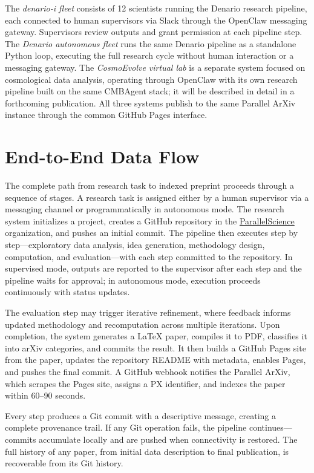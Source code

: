 \documentclass[11pt]{article}
\begin{document}
The \emph{denario-\textit{i} fleet} consists of 12 scientists running the Denario research pipeline, each connected to human supervisors via Slack through the OpenClaw messaging gateway. Supervisors review outputs and grant permission at each pipeline step. The \emph{Denario autonomous fleet} runs the same Denario pipeline as a standalone Python loop, executing the full research cycle without human interaction or a messaging gateway. The \emph{CosmoEvolve virtual lab} is a separate system focused on cosmological data analysis, operating through OpenClaw with its own research pipeline built on the same CMBAgent stack; it will be described in detail in a forthcoming publication. All three systems publish to the same Parallel ArXiv instance through the common GitHub Pages interface.


\section{End-to-End Data Flow}
\label{sec:pipeline}

The complete path from research task to indexed preprint proceeds through a sequence of stages. A research task is assigned either by a human supervisor via a messaging channel or programmatically in autonomous mode. The research system initializes a project, creates a GitHub repository in the \href{https://github.com/ParallelScience}{ParallelScience} organization, and pushes an initial commit. The pipeline then executes step by step---exploratory data analysis, idea generation, methodology design, computation, and evaluation---with each step committed to the repository. In supervised mode, outputs are reported to the supervisor after each step and the pipeline waits for approval; in autonomous mode, execution proceeds continuously with status updates.

The evaluation step may trigger iterative refinement, where feedback informs updated methodology and recomputation across multiple iterations. Upon completion, the system generates a \LaTeX{} paper, compiles it to PDF, classifies it into arXiv categories, and commits the result. It then builds a GitHub Pages site from the paper, updates the repository README with metadata, enables Pages, and pushes the final commit. A GitHub webhook notifies the Parallel ArXiv, which scrapes the Pages site, assigns a PX identifier, and indexes the paper within 60--90 seconds.

Every step produces a Git commit with a descriptive message, creating a complete provenance trail. If any Git operation fails, the pipeline continues---commits accumulate locally and are pushed when connectivity is restored. The full history of any paper, from initial data description to final publication, is recoverable from its Git history.
\end{document}
